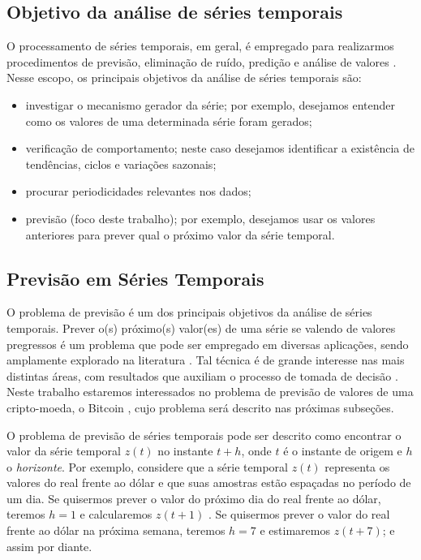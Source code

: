 \subsection{Objetivo da análise de séries temporais}

O processamento de séries temporais, em geral, é empregado para realizarmos procedimentos de previsão, eliminação de ruído, predição e análise de valores \cite{morettin2006analise, hyndman2018forecasting}. Nesse escopo, os principais objetivos da análise de séries temporais são:

\begin{itemize}
\item investigar o mecanismo gerador da série; por exemplo, desejamos entender como os valores de uma determinada série foram gerados;
\item verificação de comportamento; neste caso desejamos identificar a existência de tendências, ciclos e variações sazonais;
\item procurar periodicidades relevantes nos dados;
\item previsão (foco deste trabalho); por exemplo, desejamos usar os valores anteriores para prever qual o próximo valor da série temporal.
\end{itemize}

\subsection{Previsão em Séries Temporais}

O problema de previsão é um dos principais objetivos da análise de séries temporais. Prever o(s) próximo(s) valor(es) de uma série se valendo de valores pregressos é um problema que pode ser empregado em diversas aplicações, sendo amplamente explorado na literatura \cite{weigend2018time}. Tal técnica é de grande interesse nas mais distintas áreas, com resultados que auxiliam o processo de tomada de decisão \cite{morettin2006analise, hyndman2018forecasting}. Neste trabalho estaremos interessados no problema de previsão de valores de uma cripto-moeda, o Bitcoin \cite{nakamoto2008bitcoin}, cujo problema será descrito nas próximas subseções.

O problema de previsão de séries temporais pode ser descrito como encontrar o valor da série temporal $z(t)$ no instante $t + h$, onde $t$ é o instante de origem e $h$ o \textit{horizonte}. Por exemplo, considere que a série temporal $z(t)$ representa os valores do real frente ao dólar e que suas amostras estão espaçadas no período de um dia. Se quisermos prever o valor do próximo dia do real frente ao dólar, teremos $h = 1$ e calcularemos $z(t + 1)$ . Se quisermos prever o valor do real frente ao dólar na próxima semana, teremos $h = 7$ e estimaremos $z(t + 7)$; e assim por diante. 

